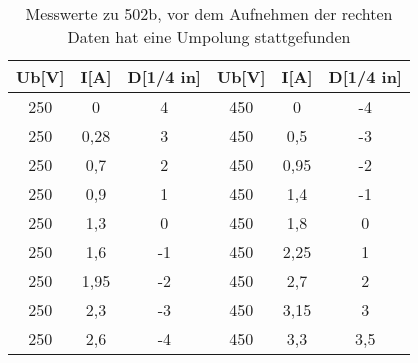 \begin{table}
\begin{center}
\begin{tabular}{c|c|c||c|c|c}
Ub[V] & I[A] & D[1/4 in] & Ub[V] & I[A] & D[1/4 in] \\
\hline
250 & 0 & 4 & 450 & 0 & -4 \\
250 & 0,28 & 3 & 450 & 0,5 & -3 \\
250 & 0,7 & 2 & 450 & 0,95 & -2 \\
250 & 0,9 & 1 & 450 & 1,4 & -1 \\
250 & 1,3 & 0 & 450 & 1,8 & 0 \\
250 & 1,6 & -1 & 450 & 2,25 & 1 \\
250 & 1,95 & -2 & 450 & 2,7 & 2 \\
250 & 2,3 & -3 & 450 & 3,15 & 3 \\
250 & 2,6 & -4 & 450 & 3,3 & 3,5 \\
\end{tabular}
\caption{Messwerte zu 502b, vor dem Aufnehmen der rechten Daten hat eine Umpolung stattgefunden}
\label{tabelle_4}
\end{center}
\end{table}
